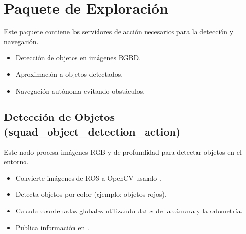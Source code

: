 \documentclass[a4paper,10pt,spanish]{sphinxmanual}
\begin{document}
\sphinxstepscope


\section{Paquete de Exploración}
\label{\detokenize{pkg_exploracion:paquete-de-exploracion}}\label{\detokenize{pkg_exploracion::doc}}
\sphinxAtStartPar
Este paquete contiene los servidores de acción necesarios para la detección y navegación.

\sphinxAtStartPar
{}
\begin{itemize}
\item {} 
\sphinxAtStartPar
{} Detección de objetos en imágenes RGBD.

\item {} 
\sphinxAtStartPar
{} Aproximación a objetos detectados.

\item {} 
\sphinxAtStartPar
{} Navegación autónoma evitando obstáculos.

\end{itemize}

\sphinxAtStartPar
{}

\sphinxstepscope


\subsection{Detección de Objetos (squad\_object\_detection\_action)}
\label{\detokenize{squad_object_detection_action:deteccion-de-objetos-squad-object-detection-action}}\label{\detokenize{squad_object_detection_action::doc}}
\sphinxAtStartPar
Este nodo procesa imágenes RGB y de profundidad para detectar objetos en el entorno.

\sphinxAtStartPar
{}
\begin{itemize}
\item {} 
\sphinxAtStartPar
Convierte imágenes de ROS a OpenCV usando .

\item {} 
\sphinxAtStartPar
Detecta objetos por color (ejemplo: objetos rojos).

\item {} 
\sphinxAtStartPar
Calcula coordenadas globales utilizando datos de la cámara y la odometría.

\item {} 
\sphinxAtStartPar
Publica información en .

\end{itemize}
\end{document}
